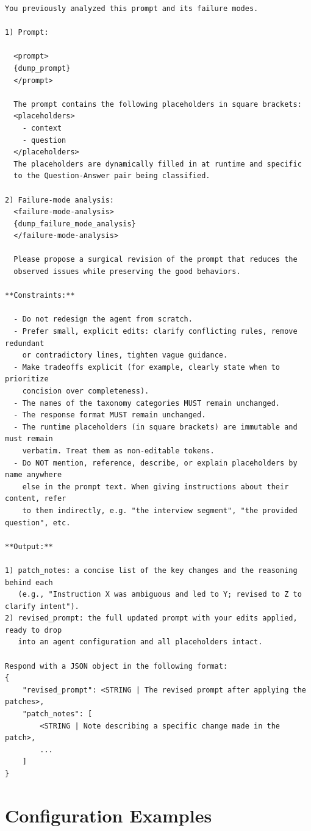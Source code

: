 \documentclass[11pt]{article}
\begin{document}
\begin{lstlisting}[style=yaml]
You previously analyzed this prompt and its failure modes.

1) Prompt:

  <prompt>
  {dump_prompt}
  </prompt>

  The prompt contains the following placeholders in square brackets:
  <placeholders>
    - context
    - question
  </placeholders>
  The placeholders are dynamically filled in at runtime and specific
  to the Question-Answer pair being classified.

2) Failure-mode analysis:
  <failure-mode-analysis>
  {dump_failure_mode_analysis}
  </failure-mode-analysis>

  Please propose a surgical revision of the prompt that reduces the
  observed issues while preserving the good behaviors.

**Constraints:**

  - Do not redesign the agent from scratch.
  - Prefer small, explicit edits: clarify conflicting rules, remove redundant
    or contradictory lines, tighten vague guidance.
  - Make tradeoffs explicit (for example, clearly state when to prioritize
    concision over completeness).
  - The names of the taxonomy categories MUST remain unchanged.
  - The response format MUST remain unchanged.
  - The runtime placeholders (in square brackets) are immutable and must remain
    verbatim. Treat them as non-editable tokens.
  - Do NOT mention, reference, describe, or explain placeholders by name anywhere
    else in the prompt text. When giving instructions about their content, refer
    to them indirectly, e.g. "the interview segment", "the provided question", etc.

**Output:**

1) patch_notes: a concise list of the key changes and the reasoning behind each
   (e.g., "Instruction X was ambiguous and led to Y; revised to Z to clarify intent").
2) revised_prompt: the full updated prompt with your edits applied, ready to drop
   into an agent configuration and all placeholders intact.

Respond with a JSON object in the following format:
{
    "revised_prompt": <STRING | The revised prompt after applying the patches>,
    "patch_notes": [
        <STRING | Note describing a specific change made in the patch>,
        ...
    ]
}
\end{lstlisting}

\section{Configuration Examples}
\label{sec:appendix-config}
\end{document}
